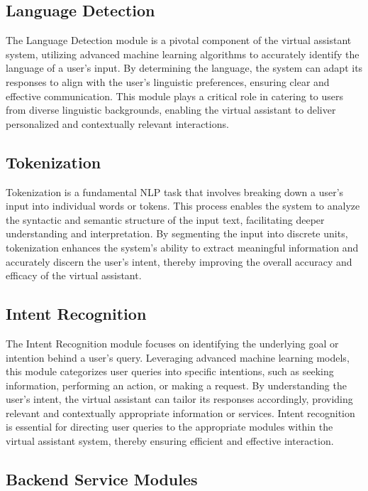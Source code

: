 \documentclass[12pt,a4paper]{report}
\begin{document}
\subsection{Language Detection}

The Language Detection module is a pivotal component of the virtual assistant system, utilizing advanced machine learning algorithms to accurately identify the language of a user's input. By determining the language, the system can adapt its responses to align with the user's linguistic preferences, ensuring clear and effective communication. This module plays a critical role in catering to users from diverse linguistic backgrounds, enabling the virtual assistant to deliver personalized and contextually relevant interactions.

\subsection{Tokenization}

Tokenization is a fundamental NLP task that involves breaking down a user's input into individual words or tokens. This process enables the system to analyze the syntactic and semantic structure of the input text, facilitating deeper understanding and interpretation. By segmenting the input into discrete units, tokenization enhances the system's ability to extract meaningful information and accurately discern the user's intent, thereby improving the overall accuracy and efficacy of the virtual assistant.

\subsection{Intent Recognition}

The Intent Recognition module focuses on identifying the underlying goal or intention behind a user's query. Leveraging advanced machine learning models, this module categorizes user queries into specific intentions, such as seeking information, performing an action, or making a request. By understanding the user's intent, the virtual assistant can tailor its responses accordingly, providing relevant and contextually appropriate information or services. Intent recognition is essential for directing user queries to the appropriate modules within the virtual assistant system, thereby ensuring efficient and effective interaction.

\subsection{Backend Service Modules}
\end{document}

